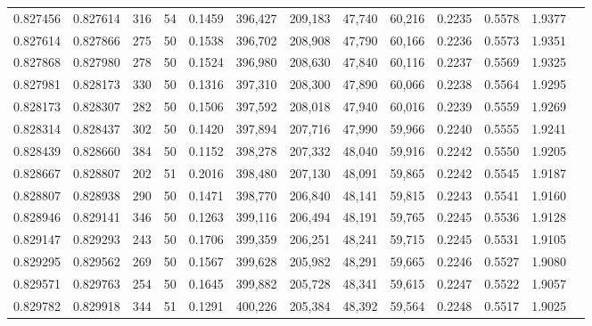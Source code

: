 \begin{tabular}{rrrrrrrrrrrrr}
0.827456 & 0.827614 &   316 &  54 &                                     0.1459 & 396,427 & 209,183 &  47,740 &  60,216 & 0.2235 & 0.5578 & 1.9377 \\
0.827614 & 0.827866 &   275 &  50 &                                     0.1538 & 396,702 & 208,908 &  47,790 &  60,166 & 0.2236 & 0.5573 & 1.9351 \\
0.827868 & 0.827980 &   278 &  50 &                                     0.1524 & 396,980 & 208,630 &  47,840 &  60,116 & 0.2237 & 0.5569 & 1.9325 \\
0.827981 & 0.828173 &   330 &  50 &                                     0.1316 & 397,310 & 208,300 &  47,890 &  60,066 & 0.2238 & 0.5564 & 1.9295 \\
0.828173 & 0.828307 &   282 &  50 &                                     0.1506 & 397,592 & 208,018 &  47,940 &  60,016 & 0.2239 & 0.5559 & 1.9269 \\
0.828314 & 0.828437 &   302 &  50 &                                     0.1420 & 397,894 & 207,716 &  47,990 &  59,966 & 0.2240 & 0.5555 & 1.9241 \\
0.828439 & 0.828660 &   384 &  50 &                                     0.1152 & 398,278 & 207,332 &  48,040 &  59,916 & 0.2242 & 0.5550 & 1.9205 \\
0.828667 & 0.828807 &   202 &  51 &                                     0.2016 & 398,480 & 207,130 &  48,091 &  59,865 & 0.2242 & 0.5545 & 1.9187 \\
0.828807 & 0.828938 &   290 &  50 &                                     0.1471 & 398,770 & 206,840 &  48,141 &  59,815 & 0.2243 & 0.5541 & 1.9160 \\
0.828946 & 0.829141 &   346 &  50 &                                     0.1263 & 399,116 & 206,494 &  48,191 &  59,765 & 0.2245 & 0.5536 & 1.9128 \\
0.829147 & 0.829293 &   243 &  50 &                                     0.1706 & 399,359 & 206,251 &  48,241 &  59,715 & 0.2245 & 0.5531 & 1.9105 \\
0.829295 & 0.829562 &   269 &  50 &                                     0.1567 & 399,628 & 205,982 &  48,291 &  59,665 & 0.2246 & 0.5527 & 1.9080 \\
0.829571 & 0.829763 &   254 &  50 &                                     0.1645 & 399,882 & 205,728 &  48,341 &  59,615 & 0.2247 & 0.5522 & 1.9057 \\
0.829782 & 0.829918 &   344 &  51 &                                     0.1291 & 400,226 & 205,384 &  48,392 &  59,564 & 0.2248 & 0.5517 & 1.9025 \\

\end{tabular}
